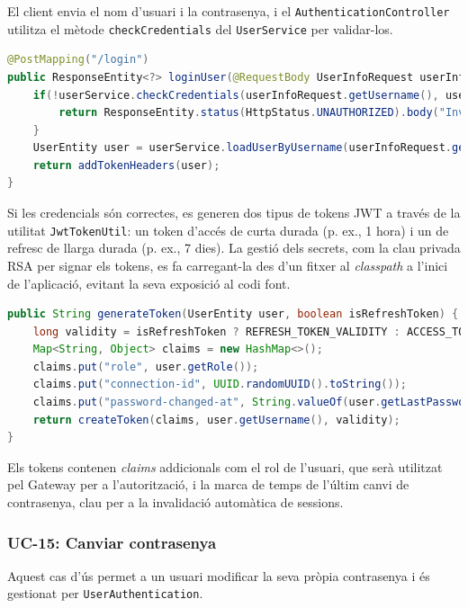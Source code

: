 El client envia el nom d'usuari i la contrasenya, i el \texttt{AuthenticationController} utilitza el mètode \texttt{checkCredentials} del \texttt{UserService} per validar-los.

\begin{lstlisting}[language=Java, caption={Endpoint de login a `AuthenticationController`}]
@PostMapping("/login")
public ResponseEntity<?> loginUser(@RequestBody UserInfoRequest userInfoRequest) {
    if(!userService.checkCredentials(userInfoRequest.getUsername(), userInfoRequest.getPassword())) {
        return ResponseEntity.status(HttpStatus.UNAUTHORIZED).body("Invalid credentials");
    }
    UserEntity user = userService.loadUserByUsername(userInfoRequest.getUsername());
    return addTokenHeaders(user);
}
\end{lstlisting}

Si les credencials són correctes, es generen dos tipus de tokens JWT a través de la utilitat \texttt{JwtTokenUtil}: un token d'accés de curta durada (p. ex., 1 hora) i un de refresc de llarga durada (p. ex., 7 dies). La gestió dels secrets, com la clau privada RSA per signar els tokens, es fa carregant-la des d'un fitxer al \textit{classpath} a l'inici de l'aplicació, evitant la seva exposició al codi font.

\begin{lstlisting}[language=Java, caption={Generació de tokens a la classe `JwtTokenUtil`}]
public String generateToken(UserEntity user, boolean isRefreshToken) {
    long validity = isRefreshToken ? REFRESH_TOKEN_VALIDITY : ACCESS_TOKEN_VALIDITY;
    Map<String, Object> claims = new HashMap<>();
    claims.put("role", user.getRole());
    claims.put("connection-id", UUID.randomUUID().toString());
    claims.put("password-changed-at", String.valueOf(user.getLastPasswordChange().getTime()));
    return createToken(claims, user.getUsername(), validity);
}
\end{lstlisting}

Els tokens contenen \textit{claims} addicionals com el rol de l'usuari, que serà utilitzat pel Gateway per a l'autorització, i la marca de temps de l'últim canvi de contrasenya, clau per a la invalidació automàtica de sessions.

\subsubsection{UC-15: Canviar contrasenya}

Aquest cas d'ús permet a un usuari modificar la seva pròpia contrasenya i és gestionat per \texttt{UserAuthentication}.

